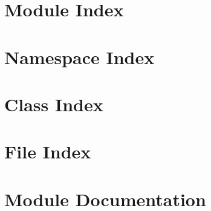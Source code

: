 \documentclass[twoside]{book}
\newcommand{\+}{\discretionary{\mbox{\scriptsize$\hookleftarrow$}}{}{}}
\begin{document}
\chapter{Module Index}

\chapter{Namespace Index}

\chapter{Class Index}

\chapter{File Index}

\chapter{Module Documentation}




































\end{document}
